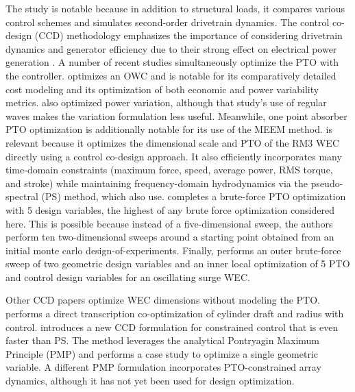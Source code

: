 The study \cite{ferri_balancing_2014} is notable because in addition to structural loads, it compares various control schemes and simulates second-order drivetrain dynamics.
The control co-design (CCD) methodology \cite{garcia-sanz_control_2019} emphasizes the importance of considering drivetrain dynamics and generator efficiency due to their strong effect on electrical power generation \cite{coe_useful_2023}.
A number of recent studies \cite{rosati_control_2023,son_performance_2016,anderson_re-imagining_2024,devin_high-dimensional_2024,grasberger_control_2024} simultaneously optimize the PTO with the controller.
\cite{rosati_control_2023} optimizes an OWC and is notable for its comparatively detailed cost modeling and its optimization of both economic and power variability metrics.
\cite{mccabe_multidisciplinary_2022} also optimized power variation, although that study's use of regular waves makes the variation formulation less useful.
Meanwhile, one point absorber PTO optimization \cite{son_performance_2016} is additionally notable for its use of the MEEM method.
\cite{gaebele_tpl_2025} is relevant because it optimizes the dimensional scale and PTO of the RM3 WEC directly using a control co-design approach.
It also efficiently incorporates many time-domain constraints (maximum force, speed, average power, RMS torque, and stroke) while maintaining frequency-domain hydrodynamics via the pseudo-spectral (PS) method, which \cite{devin_high-dimensional_2024,grasberger_control_2024} also use.
\cite{devin_high-dimensional_2024} completes a brute-force PTO optimization with 5 design variables, the highest of any brute force optimization considered here.
This is possible because instead of a five-dimensional sweep, the authors perform ten two-dimensional sweeps around a starting point obtained from an initial monte carlo design-of-experiments.
Finally, \cite{grasberger_control_2024} performs an outer brute-force sweep of two geometric design variables and an inner local optimization of 5 PTO and control design variables for an oscillating surge WEC. 

Other CCD papers optimize WEC dimensions without modeling the PTO.
\cite{herber_dynamic_2014} performs a direct transcription co-optimization of cylinder draft and radius with control.
\cite{lin_fast_2025} introduces a new CCD formulation for constrained control that is even faster than PS.
The method leverages the analytical Pontryagin Maximum Principle (PMP) and performs a case study to optimize a single geometric variable.
A different PMP formulation \cite{abdulkadir_optimal_2024} incorporates PTO-constrained array dynamics, although it has not yet been used for design optimization. 

